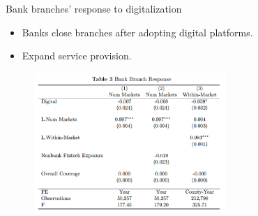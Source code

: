 \documentclass[notes,10pt, aspectratio=169]{beamer}
\begin{document}
\begin{frame}{Bank branches' response to digitalization}

    \begin{itemize}
        \item Banks close branches after adopting digital platforms.
        \item Expand service provision. \
    \end{itemize}
\begin{figure}
    \centering
    \includegraphics[width=0.65\textwidth]{imgs/tab3.png}
\end{figure}

\end{frame}
\end{document}
